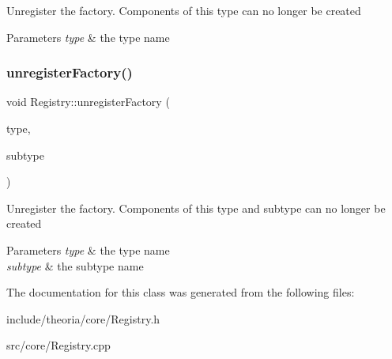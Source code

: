 Unregister the factory. Components of this type can no longer be created 
\begin{DoxyParams}{Parameters}
{\em type} & the type name \\
\hline
\end{DoxyParams}
\mbox{\label{classtheoria_1_1core_1_1Registry_aabfbd64902458b12cfd7bd20cf400837}} 
\subsubsection{\texorpdfstring{unregister\+Factory()}{unregisterFactory()}\hspace{0.1cm}{\footnotesize\ttfamily [2/2]}}
{\footnotesize\ttfamily void Registry\+::unregister\+Factory (\begin{DoxyParamCaption}\item[{const Type\+Name \&}]{type,  }\item[{const Sub\+Type\+Name \&}]{subtype }\end{DoxyParamCaption})}

Unregister the factory. Components of this type and subtype can no longer be created 
\begin{DoxyParams}{Parameters}
{\em type} & the type name \\
\hline
{\em subtype} & the subtype name \\
\hline
\end{DoxyParams}


The documentation for this class was generated from the following files\+:\begin{DoxyCompactItemize}
\item 
include/theoria/core/Registry.\+h\item 
src/core/Registry.\+cpp\end{DoxyCompactItemize}
